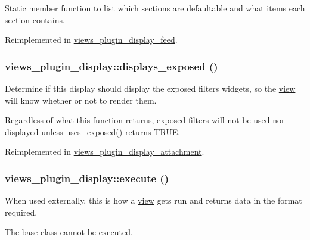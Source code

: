 Static member function to list which sections are defaultable and what items each section contains. 

Reimplemented in \hyperlink{classviews__plugin__display__feed_adbff7e4fb0bc05dfee8bc38ea1349dc}{views\_\-plugin\_\-display\_\-feed}.\hypertarget{classviews__plugin__display_47058532874d0bc5448b53e0a98489cc}{
\subsubsection[{displays\_\-exposed}]{\setlength{\rightskip}{0pt plus 5cm}views\_\-plugin\_\-display::displays\_\-exposed ()}}
\label{classviews__plugin__display_47058532874d0bc5448b53e0a98489cc}


Determine if this display should display the exposed filters widgets, so the \hyperlink{classview}{view} will know whether or not to render them.

Regardless of what this function returns, exposed filters will not be used nor displayed unless \hyperlink{classviews__plugin__display_5bfcb22187618f52bea9ea626aff18a4}{uses\_\-exposed()} returns TRUE. 

Reimplemented in \hyperlink{classviews__plugin__display__attachment_a047b05c7d1e48bd2ec6c98a27720ebf}{views\_\-plugin\_\-display\_\-attachment}.\hypertarget{classviews__plugin__display_f99c4a303d3e409ab7b14c6cfcd3a1d8}{
\subsubsection[{execute}]{\setlength{\rightskip}{0pt plus 5cm}views\_\-plugin\_\-display::execute ()}}
\label{classviews__plugin__display_f99c4a303d3e409ab7b14c6cfcd3a1d8}


When used externally, this is how a \hyperlink{classview}{view} gets run and returns data in the format required.

The base class cannot be executed. 

